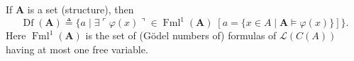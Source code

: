 If $\mathbf{A}$ is a set (structure), then
$$\operatorname{Df}(\mathbf{A}) \triangleq \{a \mid \exists \ulcorner \varphi(x) \urcorner \in \operatorname{Fml}^1(\mathbf{A}) \; [a = \{x \in A \mid \mathbf{A} \models \varphi(x)\}]\}.$$
Here $\operatorname{Fml}^1(\mathbf{A})$ is the set of (Gödel numbers of) formulas of $\mathcal{L}(C(A))$ having at most one free variable.
